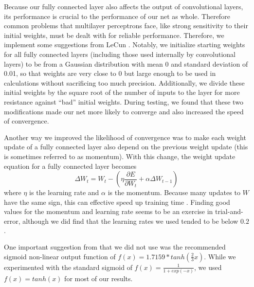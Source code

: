 \documentclass[10pt,twocolumn,letterpaper]{article}
\begin{document}
Because our fully connected layer also affects the output of convolutional layers, its performance
is crucial to the performance of our net as whole. Therefore common problems that multilayer
perceptrons face, like strong sensitivity to their initial weights, must be dealt with for
reliable performance. Therefore, we implement some suggestions from LeCun
\etal \cite{EfficientBackProp}.
Notably, we initialize starting weights for all fully connected layers (including those used
internally by convolutional layers) to be from a Gaussian distribution with mean 0 and standard
deviation of 0.01, so that weights are very close to 0 but large enough to be used in calculations
without sacrificing too much precision.
Additionally, we divide these initial weights by the square root of the number of inputs to the
layer for more resistance against ``bad'' initial weights.
During testing, we found that these two modifications made our net more likely to converge and
also increased the speed of convergence.

Another way we improved the likelihood of convergence was to make each weight update of a
fully connected layer also depend on the previous weight update (this is sometimes
referred to as momentum). With this change, the weight update equation for a fully connected
layer becomes
$$\Delta W_{t} = W_{t} - (\eta \frac{\partial E}{\partial W_{t}} +
\alpha \Delta W_{t-1})$$
where $\eta$ is the learning rate and $\alpha$ is the momentum.
Because many updates to $W$ have the same sign, this can effective speed up training time
\cite{WinMomentum}.
Finding good values for the momentum and learning rate seems to be
an exercise in trial-and-error, although we did find that
the learning rates we used tended to be below $0.2$.

One important suggestion from \cite{EfficientBackProp} that we did not use was the
recommended sigmoid non-linear output function of $f(x) = 1.7159 * tanh(\frac{2}{3}x)$.
While we experimented with the standard sigmoid of $f(x) = \frac{1}{1 + exp(-x)}$,
we used $f(x) = tanh(x)$ for most of our results.

{\small


}
\end{document}

